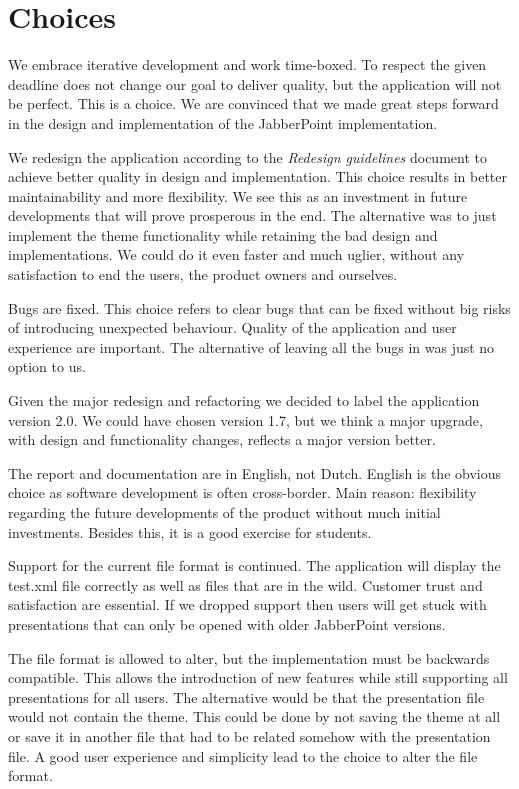 \documentclass[a4paper]{article}
\begin{document}
\section{Choices}
We embrace iterative development and work time-boxed. To respect the given deadline does not change our goal to deliver quality, but the application will not be perfect. This is a choice. We are convinced that we made great steps forward in the design and implementation of the JabberPoint implementation.

We redesign the application according to the \textit{Redesign guidelines} document to achieve better quality in design and implementation. This choice results in better maintainability and more flexibility. We see this as an investment in future developments that will prove prosperous in the end. The alternative was to just implement the theme functionality while retaining the bad design and implementations. We could do it even faster and much uglier, without any satisfaction to end the users, the product owners and ourselves.

Bugs are fixed. This choice refers to clear bugs that can be fixed without big risks of introducing unexpected behaviour. Quality of the application and user experience are important. The alternative of leaving all the bugs in was just no option to us.

Given the major redesign and refactoring we decided to label the application version 2.0. We could have chosen version 1.7, but we think a major upgrade, with design and functionality changes, reflects a major version better. 

The report and documentation are in English, not Dutch. English is the obvious choice as software development is often cross-border. Main reason: flexibility regarding the future developments of the product without much initial investments. Besides this, it is a good exercise for students.

Support for the current file format is continued. The application will display the test.xml file correctly as well as files that are in the wild. Customer trust and satisfaction are essential. If we dropped support then users will get stuck with presentations that can only be opened with older JabberPoint versions.
 
The file format is allowed to alter, but the implementation must be backwards compatible. This allows the introduction of new features while still supporting all presentations for all users. The alternative would be that the presentation file would not contain the theme. This could be done by not saving the theme at all or save it in another file that had to be related somehow with the presentation file. A good user experience and simplicity lead to the choice to alter the file format.
\end{document}
